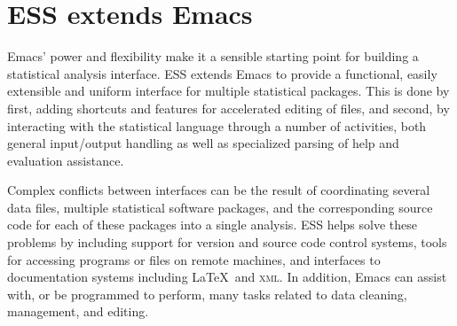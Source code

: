 \documentclass{article}
\newcommand{\stexttt}[1]{{\small\texttt{#1}}}
\begin{document}
\section{ESS extends Emacs}
\label{sec:ess-extends-emacs}

Emacs' power and flexibility make it a sensible starting point for
building a statistical analysis interface.  ESS extends Emacs to
provide a functional, easily extensible and uniform interface for
multiple statistical packages.  This is done by first, adding
shortcuts and features for accelerated editing of files, and second,
by interacting with the statistical language through a number of
activities, both general input/output handling as well as specialized
parsing of help and evaluation assistance.

Complex conflicts between interfaces can be the result of coordinating
several data files, multiple statistical software packages, and the
corresponding source code for each of these packages into a single
analysis.  ESS helps solve these problems by including support for
version and source code control systems, tools for accessing programs
or files on remote machines, and interfaces to documentation systems
including \LaTeX\ and \textsc{xml}.  In addition, Emacs can assist
with, or be programmed to perform, many tasks related to data
cleaning, management, and editing.  




\end{document}
